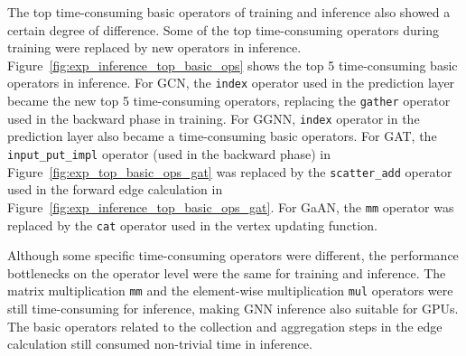 The top time-consuming basic operators of training and inference also showed a certain degree of difference.
%
Some of the top time-consuming operators during training were replaced by new operators in inference.
%
Figure~\ref{fig:exp_inference_top_basic_ops} shows the top 5 time-consuming basic operators in inference.
%
For GCN, the \texttt{index} operator used in the prediction layer became the new top 5 time-consuming operators, replacing the \texttt{gather} operator used in the backward phase in training.
%
%
For GGNN, \texttt{index} operator in the prediction layer also became a time-consuming basic operators.
%
%
For GAT, the \texttt{input\_put\_impl} operator (used in the backward phase) in Figure~\ref{fig:exp_top_basic_ops_gat} was replaced by the \texttt{scatter\_add} operator used in the forward edge calculation in Figure~\ref{fig:exp_inference_top_basic_ops_gat}.
%
%
For GaAN, the \texttt{mm} operator was replaced by the \texttt{cat} operator used in the vertex updating function.

Although some specific time-consuming operators were different, the performance bottlenecks on the operator level were the same for training and inference.
%
The matrix multiplication \texttt{mm} and the element-wise multiplication \texttt{mul} operators were still time-consuming for inference, making GNN inference also {suitable for GPUs}.
%
The basic operators related to the collection and aggregation steps in the edge calculation still consumed non-trivial time in inference.

